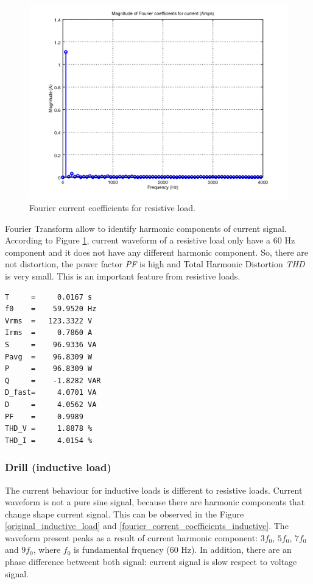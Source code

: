 \documentclass[journal]{IEEEtran}
\begin{document}
\begin{figure}[h]
\centering
\includegraphics[clip,width=\columnwidth]
{zoomed_current_furier_coefficients_resistive.png}
\caption{Fourier current coefficients for resistive load.}
\label{fourier_corrent_coefficients_resistive}
\end{figure}

Fourier Transform allow to identify harmonic components of
current signal. According to Figure
\ref{fourier_corrent_coefficients_resistive}, current 
waveform of a resistive load only have a 60 Hz component
and it does not have any different harmonic component. So, 
there are not distortion, the power factor \textit{PF} is 
high and Total Harmonic Distortion \textit{THD} is 
very small.
This is an important feature from resistive loads.  

\begin{lstlisting}[caption = Output for resistive load.]
T     =     0.0167 s 
f0    =    59.9520 Hz 
Vrms  =   123.3322 V
Irms  =     0.7860 A
S     =    96.9336 VA
Pavg  =    96.8309 W 
P     =    96.8309 W 
Q     =    -1.8282 VAR 
D_fast=     4.0701 VA 
D     =     4.0562 VA 
PF    =     0.9989 
THD_V =     1.8878 %
THD_I =     4.0154 %
\end{lstlisting}

\subsubsection{Drill (inductive load)} The current 
behaviour for inductive loads is different to resistive 
loads. Current waveform is not a pure sine signal, 
because there are harmonic components that change shape 
current signal. This can be observed in the Figure 
\ref{original_inductive_load} and 
\ref{fourier_corrent_coefficients_inductive}. 
The waveform present peaks as a result of 
current harmonic component: $3 f_0$, $5 f_0$, $7 f_0$ 
and $9 f_0$,  where $f_0$ is fundamental frquency (60 Hz). 
In addition, there are an 
phase difference betweent both signal: current signal is
slow respect to voltage signal.
\end{document}
